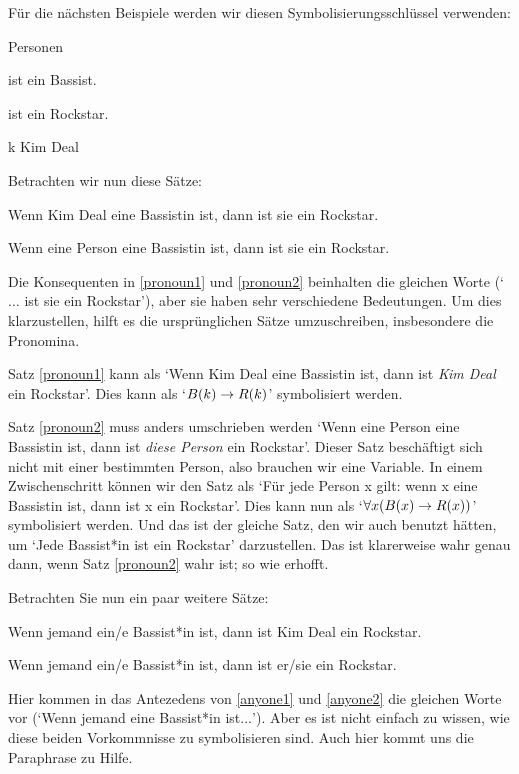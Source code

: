 Für die nächsten Beispiele werden wir diesen Symbolisierungsschlüssel verwenden:
	\begin{ekey}
		\item[\text{Domäne}] Personen
		\item[\atom{B}{x}]  ist ein Bassist.
		\item[\atom{R}{x}]  ist ein Rockstar.
		\item[k] Kim Deal
	\end{ekey}
Betrachten wir nun diese Sätze:
	\begin{earg}
		\item[\ex{pronoun1}] Wenn Kim Deal eine Bassistin ist, dann ist sie ein Rockstar.
		\item[\ex{pronoun2}] Wenn eine Person eine Bassistin ist, dann ist sie ein Rockstar.
	\end{earg}
Die Konsequenten in \ref{pronoun1} und \ref{pronoun2} beinhalten die gleichen Worte (`$\ldots$ ist sie ein Rockstar'), aber sie haben sehr verschiedene Bedeutungen. Um dies klarzustellen, hilft es die ursprünglichen Sätze umzuschreiben, insbesondere die Pronomina.

Satz \ref{pronoun1} kann als `Wenn Kim Deal eine Bassistin ist, dann ist \emph{Kim Deal} ein Rockstar'. Dies kann als `$\mathord{B}(k) \rightarrow \mathord{R}(k)$' symbolisiert werden.

Satz \ref{pronoun2} muss anders umschrieben werden `Wenn eine Person eine Bassistin ist, dann ist \emph{diese Person} ein Rockstar'. Dieser Satz beschäftigt sich nicht mit einer bestimmten Person, also brauchen wir eine Variable. In einem Zwischenschritt können wir den Satz als `Für jede Person x gilt: wenn x eine Bassistin ist, dann ist x ein Rockstar'. Dies kann nun als `$\forall x (\mathord{B}(x) \rightarrow \mathord{R}(x))$' symbolisiert werden. Und das ist der gleiche Satz, den wir auch benutzt hätten, um `Jede Bassist*in ist ein Rockstar' darzustellen. Das ist klarerweise wahr genau dann, wenn Satz \ref{pronoun2} wahr ist; so wie erhofft.

Betrachten Sie nun ein paar weitere Sätze:
	\begin{earg}
		\item[\ex{anyone1}] Wenn jemand ein/e Bassist*in ist, dann ist Kim Deal ein Rockstar.
		\item[\ex{anyone2}] Wenn jemand ein/e Bassist*in ist, dann ist er/sie ein Rockstar.
	\end{earg}
Hier kommen in das Antezedens von \ref{anyone1} und \ref{anyone2} die gleichen Worte vor (`Wenn jemand eine Bassist*in ist$\ldots$'). Aber es ist nicht einfach zu wissen, wie diese beiden Vorkommnisse zu symbolisieren sind. Auch hier kommt uns die Paraphrase zu Hilfe. 

